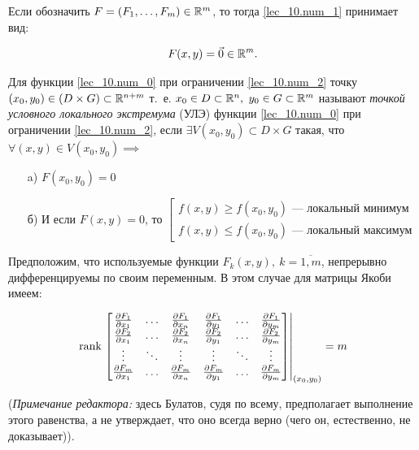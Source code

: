 \documentclass[../../main.tex]{subfiles}
\begin{document}
	Если обозначить $F = \left( F_1, \ldots, F_m \right) \in \mathbb{R}^m$, 
	то тогда \eqref{lec_10.num_1} принимает вид:
	
	\begin{equation} \label{lec_10.num_2}
		F(x, y) = \vec{0} \in \mathbb{R}^m.
	\end{equation}
	
	Для функции \eqref{lec_10.num_0} при ограничении \eqref{lec_10.num_2}
	точку $(x_0, y_0) \in \left( D \times G \right) 
	\subset \mathbb{R}^{n+m}$
	т.~е. $x_0 \in D \subset \mathbb{R}^n,$ $y_0 \in G \subset \mathbb{R}^m$ называют
	\emph{точкой условного локального экстремума} (УЛЭ) функции 
	\eqref{lec_10.num_0} при ограничении \eqref{lec_10.num_2}, если
	$\exists V( x_0, y_0 ) \subset D \times G $ такая, что 
	$\forall ( x, y) \in V( x_0, y_0) \implies $
	
	\begin{itemize}
		\item[a)] 
		$F(x_0, y_0) = 0$
		\item[б)] И если $F(x, y) = 0$, то
		$\left[ \begin{gathered}
		f(x, y) \ge f(x_0, y_0)\text{~--- локальный минимум} \\
		f(x, y) \le f(x_0, y_0)\text{~--- локальный максимум} 
		\end{gathered} \right.$
	\end{itemize}
		
Предположим, что используемые функции $F_k(x,y),\ k = \overline{1, m}$, 
непрерывно дифференцируемы по своим переменным. В этом случае для 
матрицы Якоби имеем:

\begin{equation} \label{lec_10.num_3}
	\operatorname{rank} \left.\begin{bmatrix}
	\frac{\partial F_1}{\partial x_1} & \ldots & \frac{\partial F_1}{\partial x_n} & 
	\frac{\partial F_1}{\partial y_1} & \ldots & \frac{\partial F_1}{\partial y_m} \\
	\frac{\partial F_2}{\partial x_1} & \ldots & \frac{\partial F_2}{\partial x_n} &
	\frac{\partial F_2}{\partial y_1} & \ldots & \frac{\partial F_2}{\partial y_m} \\
	\vdots & \ddots & \vdots & \vdots & \ddots & \vdots \\
	\frac{\partial F_m}{\partial x_1} & \ldots & \frac{\partial F_m}{\partial x_n} &
	\frac{\partial F_m}{\partial y_1} & \ldots & \frac{\partial F_m}{\partial y_m}
	\end{bmatrix}
	\right|_{(x_0, y_0)} = m
\end{equation}

(\emph{Примечание редактора:} здесь Булатов, судя по всему, предполагает 
выполнение этого равенства, а не утверждает, что оно всегда верно (чего он, 
естественно, не доказывает)). 
		
\end{document}
